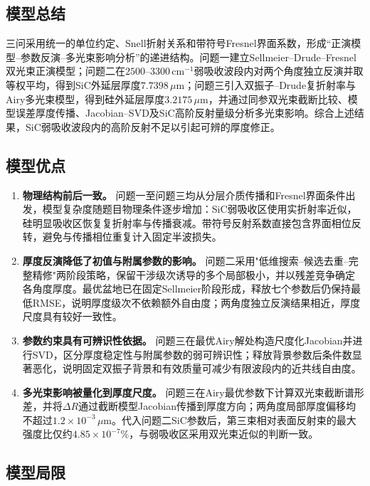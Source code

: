 \subsection{模型总结}

三问采用统一的单位约定、Snell折射关系和带符号Fresnel界面系数，形成“正演模型--参数反演--多光束影响分析”的递进结构。问题一建立Sellmeier--Drude--Fresnel双光束正演模型；问题二在$2500$--$3300\,\mathrm{cm^{-1}}$弱吸收波段内对两个角度独立反演并取等权平均，得到SiC外延层厚度$7.7398\,\mu\mathrm m$；问题三引入双振子--Drude复折射率与Airy多光束模型，得到硅外延层厚度$3.2175\,\mu\mathrm m$，并通过同参双光束截断比较、模型误差厚度传播、Jacobian--SVD及SiC高阶反射量级分析多光束影响。综合上述结果，SiC弱吸收波段内的高阶反射不足以引起可辨的厚度修正。

\subsection{模型优点}

\begin{enumerate}[label=\textbf{\arabic*.}]
\item \textbf{物理结构前后一致。} 问题一至问题三均从分层介质传播和Fresnel界面条件出发，模型复杂度随题目物理条件逐步增加：SiC弱吸收区使用实折射率近似，硅明显吸收区恢复复折射率与传播衰减。带符号反射系数直接包含界面相位反转，避免与传播相位重复计入固定半波损失。

\item \textbf{厚度反演降低了初值与附属参数的影响。} 问题二采用"低维搜索--候选去重--完整精修"两阶段策略，保留干涉级次诱导的多个局部极小，并以残差竞争确定各角度厚度。最优盆地已在固定Sellmeier阶段形成，释放七个参数后仍保持最低RMSE，说明厚度级次不依赖额外自由度；两角度独立反演结果相近，厚度尺度具有较好一致性。

\item \textbf{参数约束具有可辨识性依据。} 问题三在最优Airy解处构造尺度化Jacobian并进行SVD，区分厚度稳定性与附属参数的弱可辨识性；释放背景参数后条件数显著恶化，说明固定双振子背景和有效质量可减少有限波段内的近共线自由度。

\item \textbf{多光束影响被量化到厚度尺度。} 问题三在Airy最优参数下计算双光束截断谱形差，并将$\Delta R$通过截断模型Jacobian传播到厚度方向；两角度局部厚度偏移均不超过$1.2\times10^{-3}\,\mu\mathrm m$。代入问题二SiC参数后，第三束相对表面反射束的最大强度比仅约$4.85\times10^{-7}\%$，与弱吸收区采用双光束近似的判断一致。
\end{enumerate}

\subsection{模型局限}

